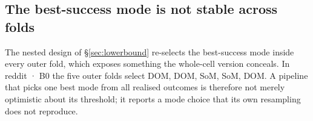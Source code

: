 \subsection{The best-success mode is not stable across folds}\label{the-best-success-mode-is-not-stable-across-folds}

The nested design of \S\ref{sec:lowerbound} re-selects the best-success mode inside every outer fold, which exposes something the whole-cell version conceals. In reddit · B0 the five outer folds select DOM, DOM, SoM, SoM, DOM. A pipeline that picks one best mode from all realised outcomes is therefore not merely optimistic about its threshold; it reports a mode choice that its own resampling does not reproduce.
